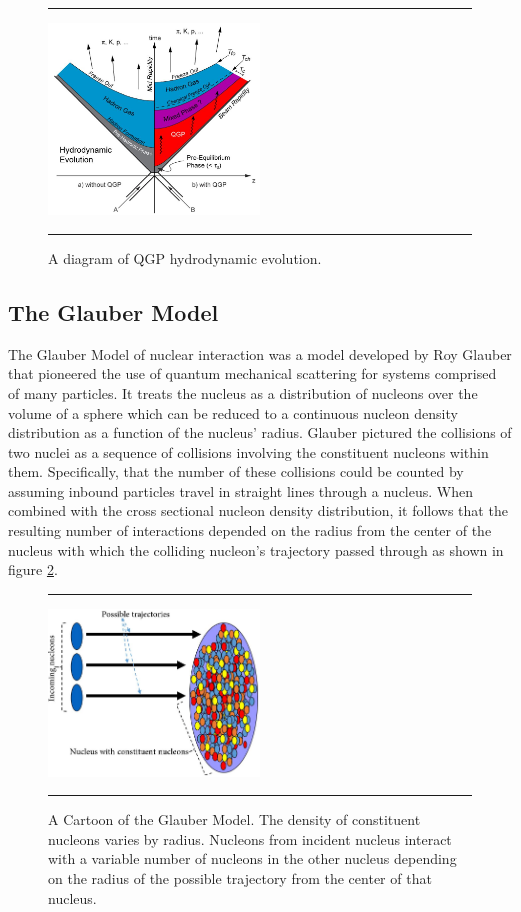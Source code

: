 \begin{figure}[b!]
  \centering
    \rule{35em}{0.5pt}
    \includegraphics[width=0.5\textwidth]{Figures/hydrodynamicevolution.JPG}

  \caption[A diagram of QGP hydrodynamic evolution.]{A diagram of QGP hydrodynamic evolution.}
  \label{fig:hydroevolution}
    \rule{35em}{0.5pt}
\end{figure}

\subsection{The Glauber Model}
\label{sect:glauber}
The Glauber Model of nuclear interaction was a model developed by Roy Glauber that pioneered the use of quantum mechanical scattering for systems comprised of many particles. It treats the nucleus as a distribution of nucleons over the volume of a sphere which can be reduced to a continuous nucleon density distribution as a function of the nucleus' radius\citep{Miller:2007ri}. Glauber pictured the collisions of two nuclei as a sequence of collisions involving the constituent nucleons within them. Specifically, that the number of these collisions could be counted by assuming inbound particles travel in straight lines through a nucleus. When combined with the cross sectional nucleon density distribution, it follows that the resulting number of interactions depended on the radius from the center of the nucleus with which the colliding nucleon's trajectory passed through as shown in figure \ref{fig:glaubermodel}.
\begin{figure}[b!]
  \centering
    \rule{35em}{0.5pt}
    \includegraphics[width=0.5\textwidth]{Figures/glauberpic.jpg}

  \caption[A Cartoon of the Glauber Model]{A Cartoon of the Glauber Model. The density of constituent nucleons varies by radius. Nucleons from incident nucleus interact with a variable number of nucleons in the other nucleus depending on the radius of the possible trajectory from the center of that nucleus. \citep{Nagle:2006}}
  \label{fig:glaubermodel}
    \rule{35em}{0.5pt}
\end{figure}

